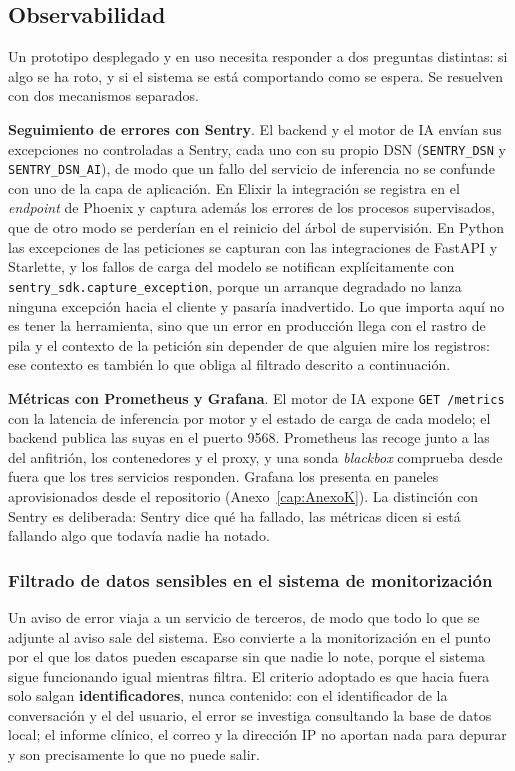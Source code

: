 \subsection{Observabilidad}
\label{sec:observabilidad}

Un prototipo desplegado y en uso necesita responder a dos preguntas distintas: si algo se ha roto, y si el sistema se está comportando como se espera. Se resuelven con dos mecanismos separados.

\textbf{Seguimiento de errores con Sentry}. El backend y el motor de IA envían sus excepciones no controladas a Sentry, cada uno con su propio DSN (\texttt{SENTRY\_DSN} y \texttt{SENTRY\_DSN\_AI}), de modo que un fallo del servicio de inferencia no se confunde con uno de la capa de aplicación. En Elixir la integración se registra en el \emph{endpoint} de Phoenix y captura además los errores de los procesos supervisados, que de otro modo se perderían en el reinicio del árbol de supervisión. En Python las excepciones de las peticiones se capturan con las integraciones de FastAPI y Starlette, y los fallos de carga del modelo se notifican explícitamente con \texttt{sentry\_sdk.capture\_exception}, porque un arranque degradado no lanza ninguna excepción hacia el cliente y pasaría inadvertido. Lo que importa aquí no es tener la herramienta, sino que un error en producción llega con el rastro de pila y el contexto de la petición sin depender de que alguien mire los registros: ese contexto es también lo que obliga al filtrado descrito a continuación.

\textbf{Métricas con Prometheus y Grafana}. El motor de IA expone \texttt{GET /metrics} con la latencia de inferencia por motor y el estado de carga de cada modelo; el backend publica las suyas en el puerto 9568. Prometheus las recoge junto a las del anfitrión, los contenedores y el proxy, y una sonda \emph{blackbox} comprueba desde fuera que los tres servicios responden. Grafana los presenta en paneles aprovisionados desde el repositorio (Anexo~\ref{cap:AnexoK}). La distinción con Sentry es deliberada: Sentry dice qué ha fallado, las métricas dicen si está fallando algo que todavía nadie ha notado.

\subsubsection{Filtrado de datos sensibles en el sistema de monitorización}

Un aviso de error viaja a un servicio de terceros, de modo que todo lo que se adjunte al aviso sale del sistema. Eso convierte a la monitorización en el punto por el que los datos pueden escaparse sin que nadie lo note, porque el sistema sigue funcionando igual mientras filtra. El criterio adoptado es que hacia fuera solo salgan \textbf{identificadores}, nunca contenido: con el identificador de la conversación y el del usuario, el error se investiga consultando la base de datos local; el informe clínico, el correo y la dirección IP no aportan nada para depurar y son precisamente lo que no puede salir.


